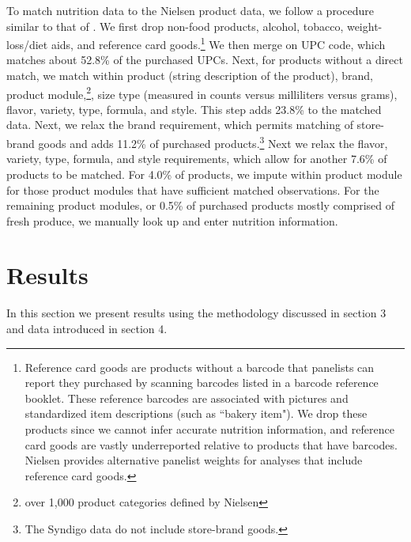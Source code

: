 \documentclass[12pt]{article}
\begin{document}
To match nutrition data to the Nielsen product data, we follow a procedure similar to that of \textcite{dubois2014prices}. We first drop non-food products, alcohol, tobacco, weight-loss/diet aids, and reference card goods.\footnote{Reference card goods are products without a barcode that panelists can report they purchased by scanning barcodes listed in a barcode reference booklet. These reference barcodes are associated with pictures and standardized item descriptions (such as ``bakery item"). We drop these products since we cannot infer accurate nutrition information, and reference card goods are vastly underreported relative to products that have barcodes. Nielsen provides alternative panelist weights for analyses that include reference card goods.} %
We then merge on UPC code, which matches about 52.8\% of the purchased UPCs. Next, for products without a direct match, we match within product (string description of the product), brand, product module,\footnote{over 1,000 product categories defined by Nielsen}, size type (measured in counts versus milliliters versus grams), flavor, variety, type, formula, and style. This step adds 23.8\% to the matched data. Next, we relax the brand requirement, which permits matching of store-brand goods and adds 11.2\% of purchased products.\footnote{The Syndigo data do not include store-brand goods.} Next we relax the flavor, variety, type, formula, and style requirements, which allow for another 7.6\% of products to be matched. For 4.0\% of products, we impute within product module for those product modules that have sufficient matched observations. For the remaining product modules, or 0.5\% of purchased products mostly comprised of fresh produce, we manually look up and enter nutrition information.


\section{Results} \label{results}
In this section we present results using the methodology discussed in section 3 and data introduced in section 4.
\end{document}
